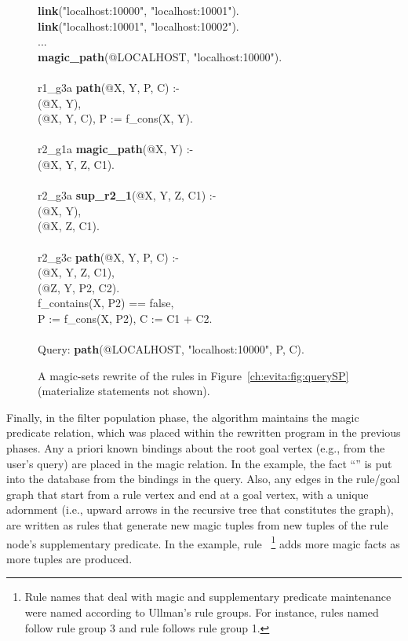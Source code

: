 \begin{figure}[!t]
\ssp
\begin{boxedminipage}{\linewidth}
{\bf link}("localhost:10000", "localhost:10001").\\
{\bf link}("localhost:10001", "localhost:10002").\\
...\\
{\bf magic\_path}(@LOCALHOST, "localhost:10000"). \\
\\
r1\_g3a {\bf path}(@X, Y, P, C) :- \\
(@X, Y), \\
(@X, Y, C), P := f\_cons(X, Y).\\
\\
r2\_g1a {\bf magic\_path}(@X, Y) :- \\
(@X, Y, Z, C1). \\
\\
r2\_g3a {\bf sup\_r2\_1}(@X, Y, Z, C1) :- \\
(@X, Y), \\
(@X, Z, C1). \\
\\
r2\_g3c {\bf path}(@X, Y, P, C) :- \\
(@X, Y, Z, C1), \\
(@Z, Y, P2, C2). \\
\datalogspace f\_contains(X, P2) == false, \\
\datalogspace P := f\_cons(X, P2), C := C1 + C2. \\
\\
Query: {\bf path}(@LOCALHOST, "localhost:10000", P, C).
\end{boxedminipage}
\caption{\label{ch:evita:fig:magicSP}A magic-sets rewrite of
      the rules in Figure~\ref{ch:evita:fig:querySP} (materialize statements not shown).}
\end{figure}

Finally, in the filter population phase, the algorithm maintains the
magic predicate relation, which was placed within the rewritten program
in the previous phases.  Any a priori known bindings about the root goal vertex
(e.g., from the user's query) are placed in the magic relation. In the example, the 
fact ``'' is put into the
database from the bindings in the  query.  Also, any edges in
the rule/goal graph that start from a rule vertex and end at a goal vertex, with a
unique adornment (i.e., upward arrows in the recursive tree that constitutes the graph), are written as
rules that generate new magic tuples from new tuples of the rule
node's supplementary predicate. In the example, rule ~\footnote{Rule names that
deal with magic and supplementary predicate maintenance were named according
to Ullman's rule groups. For instance, rules named  follow rule group 3
and rule  follows rule group 1.}  adds
more magic facts as more  tuples are produced.

